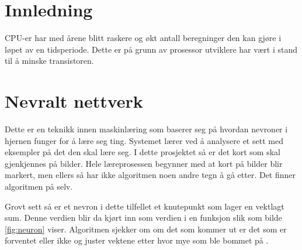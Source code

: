\begin{titlepage}
	
	
	
	
	 
	
	\vfill %
	
\end{titlepage}
\newpage
\tableofcontents
\newpage

\section{Innledning}
CPU-er har med årene blitt raskere og økt antall beregninger den kan gjøre i løpet av en tidsperiode. Dette er på grunn av prosessor utviklere har vært i stand til å minske transistoren.

\newpage
\section{Nevralt nettverk}
Dette er en teknikk innen maskinlæring som baserer seg på hvordan nevroner i hjernen funger for å lære seg ting. Systemet lærer ved å analysere et sett med eksempler på det den skal lære seg. I dette prosjektet så er det kort som skal gjenkjennes på bilder. Hele læreprosessen begynner med at kort på bilder blir markert, men ellers så har ikke algoritmen noen andre tegn å gå etter. Det finner algoritmen på selv.

Grovt sett så er et nevron i dette tilfellet et knutepunkt som lager en vektlagt sum. Denne verdien blir da kjørt inn som verdien i en funksjon slik som bilde \ref{fig:neuron} viser. Algoritmen sjekker om om det som kommer ut er det som er forventet eller ikke og juster vektene etter hvor mye som ble bommet på \cite{Bonaccorso2017}.

